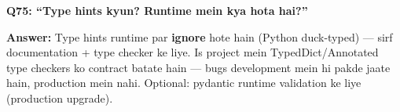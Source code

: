 \begin{interviewbox}
\textbf{Q75: ``Type hints kyun? Runtime mein kya hota hai?''}

\textbf{Answer:} Type hints runtime par \textbf{ignore} hote hain (Python duck-typed) --- sirf documentation + type checker ke liye. Is project mein TypedDict/Annotated type checkers ko contract batate hain --- bugs development mein hi pakde jaate hain, production mein nahi. Optional: pydantic runtime validation ke liye (production upgrade).
\end{interviewbox}
